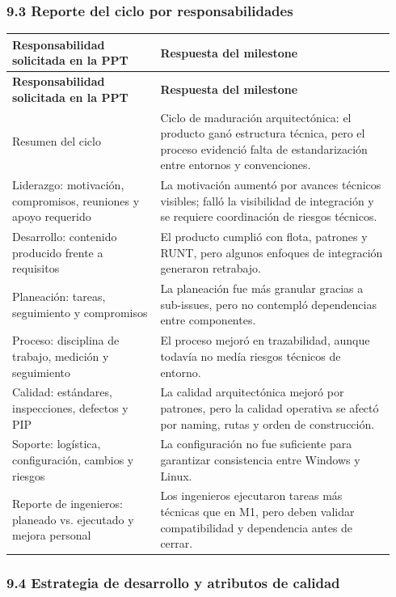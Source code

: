\documentclass[11pt,a4paper]{article}
\begin{document}
\subsubsection{9.3 Reporte del ciclo por responsabilidades}

\begingroup
\small
\setlength{\tabcolsep}{3pt}
\begin{longtable}{P{0.36\linewidth}P{0.58\linewidth}}
\toprule
\textbf{Responsabilidad solicitada en la PPT} & \textbf{Respuesta del milestone} \\
\midrule
\endfirsthead
\toprule
\textbf{Responsabilidad solicitada en la PPT} & \textbf{Respuesta del milestone} \\
\midrule
\endhead
\bottomrule
\endlastfoot
Resumen del ciclo & Ciclo de maduración arquitectónica: el producto ganó estructura técnica, pero el proceso evidenció falta de estandarización entre entornos y convenciones. \\
Liderazgo: motivación, compromisos, reuniones y apoyo requerido & La motivación aumentó por avances técnicos visibles; falló la visibilidad de integración y se requiere coordinación de riesgos técnicos. \\
Desarrollo: contenido producido frente a requisitos & El producto cumplió con flota, patrones y RUNT, pero algunos enfoques de integración generaron retrabajo. \\
Planeación: tareas, seguimiento y compromisos & La planeación fue más granular gracias a sub-issues, pero no contempló dependencias entre componentes. \\
Proceso: disciplina de trabajo, medición y seguimiento & El proceso mejoró en trazabilidad, aunque todavía no medía riesgos técnicos de entorno. \\
Calidad: estándares, inspecciones, defectos y PIP & La calidad arquitectónica mejoró por patrones, pero la calidad operativa se afectó por naming, rutas y orden de construcción. \\
Soporte: logística, configuración, cambios y riesgos & La configuración no fue suficiente para garantizar consistencia entre Windows y Linux. \\
Reporte de ingenieros: planeado vs. ejecutado y mejora personal & Los ingenieros ejecutaron tareas más técnicas que en M1, pero deben validar compatibilidad y dependencia antes de cerrar. \\
\end{longtable}
\endgroup

\subsubsection{9.4 Estrategia de desarrollo y atributos de calidad}
\end{document}
